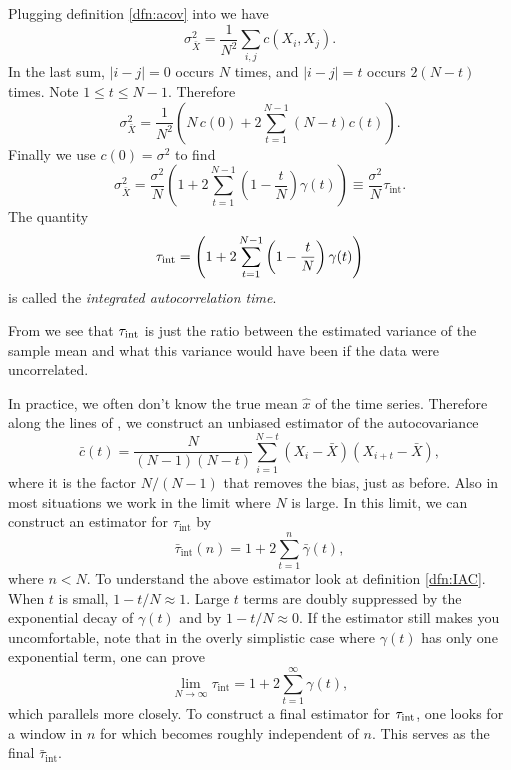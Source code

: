Plugging definition \eqref{dfn:acov} into  we have 
\begin{equation}
  \sigma^2_{\bar{X}}=\frac{1}{N^2}\sum_{i,j}c(X_i,X_j).
\end{equation}
In the last sum, $|i-j|=0$ occurs $N$ times, and $|i-j|=t$ occurs
$2(N-t)$ times. Note $1\leq t\leq N-1$. Therefore
\begin{equation}
  \sigma^2_{\bar{X}}=\frac{1}{N^2}
    \left(N\,c(0)+2\sum_{t=1}^{N-1}(N-t)c(t)\right).
\end{equation}
Finally we use $c(0)=\sigma^2$ to find
\begin{equation}\label{eq:IAC}
  \sigma^2_{\bar{X}}
    =\frac{\sigma^2}{N}\left(1+2\sum_{t=1}^{N-1}\left(1-\frac{t}{N}\right)
     \gamma(t)\right)
    \equiv\frac{\sigma^2}{N}\tau_\text{int}.
\end{equation}
The quantity
\begin{equation}\label{dfn:IAC}\index{autocorrelation time!integrated}
  \tauint=\left(1+2\sum_{t=1}^{N-1}\left(1-\frac{t}{N}\right)
   \gamma(t)\right)
\end{equation}
is called the {\it integrated autocorrelation time}.

From  we see that $\tau_\text{int}$ is just the ratio between the
estimated variance of the sample mean and what this variance would have been 
if the data were uncorrelated. 

In practice, we often don't know the true mean $\hat{x}$ of the time series.
Therefore along the lines of , we construct an unbiased
estimator of the autocovariance
\begin{equation}
  \bar{c}(t)=\frac{N}{(N-1)(N-t)}
    \sum_{i=1}^{N-t}(X_i-\bar{X})(X_{i+t}-\bar{X}),
\end{equation}
where it is the factor $N/(N-1)$ that removes the bias, just as before.
Also in most situations we work in the limit where $N$ is large. In this
limit, we can construct an estimator for $\tau_\text{int}$ by
\begin{equation}\label{eq:IACest}
  \bar{\tau}_\text{int}(n)=1+2\sum_{t=1}^n\bar{\gamma}(t),
\end{equation}
where $n<N$. To understand the above estimator look at definition
\eqref{dfn:IAC}. When $t$ is small, $1-t/N\approx 1$. Large $t$ terms
are doubly suppressed by the exponential decay of $\gamma(t)$ and
by $1-t/N\approx 0$. If the estimator still makes you uncomfortable,
note that in the overly simplistic case where
$\gamma(t)$ has only one exponential term, one can prove
\begin{equation}
  \lim_{N\to\infty}\tau_\text{int}=1+2\sum_{t=1}^\infty\gamma(t),
\end{equation}
which parallels  more closely. To construct a final
estimator for $\tau_\text{int}$, one looks for a window in $n$ for which
 becomes roughly independent of $n$. This serves
as the final $\bar{\tau}_\text{int}$.



